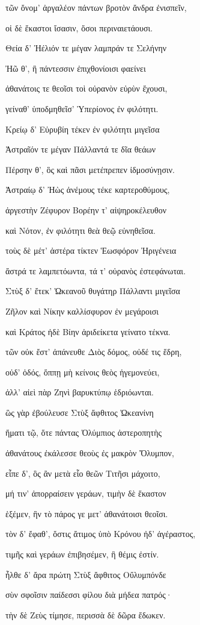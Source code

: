 \begin{pages}
\begin{Leftside}
τῶν ὄνομ' ἀργαλέον πάντων βροτὸν ἄνδρα ἐνισπεῖν, 

οἱ δὲ ἕκαστοι ἴσασιν, ὅσοι περιναιετάουσι.  

Θεία δ' Ἠέλιόν τε μέγαν λαμπράν τε Σελήνην 

Ἠῶ θ', ἣ πάντεσσιν ἐπιχθονίοισι φαείνει

ἀθανάτοις τε θεοῖσι τοὶ οὐρανὸν εὐρὺν ἔχουσι,

γείναθ' ὑποδμηθεῖσ' Ὑπερίονος ἐν φιλότητι. 

Κρείῳ δ' Εὐρυβίη τέκεν ἐν φιλότητι μιγεῖσα  

Ἀστραῖόν τε μέγαν Πάλλαντά τε δῖα θεάων

Πέρσην θ', ὃς καὶ πᾶσι μετέπρεπεν ἰδμοσύνῃσιν.

Ἀστραίῳ δ' Ἠὼς ἀνέμους τέκε καρτεροθύμους,

ἀργεστὴν Ζέφυρον Βορέην τ' αἰψηροκέλευθον 

καὶ Νότον, ἐν φιλότητι θεὰ θεῷ εὐνηθεῖσα. 

τοὺς δὲ μέτ' ἀστέρα τίκτεν Ἑωσφόρον Ἠριγένεια

ἄστρά τε λαμπετόωντα, τά τ' οὐρανὸς ἐστεφάνωται. 

Στὺξ δ' ἔτεκ' Ὠκεανοῦ θυγάτηρ Πάλλαντι μιγεῖσα

Ζῆλον καὶ Νίκην καλλίσφυρον ἐν μεγάροισι 

καὶ Κράτος ἠδὲ Βίην ἀριδείκετα γείνατο τέκνα.  

τῶν οὐκ ἔστ' ἀπάνευθε Διὸς δόμος, οὐδέ τις ἕδρη,

οὐδ' ὁδός, ὅππῃ μὴ κείνοις θεὸς ἡγεμονεύει,

ἀλλ' αἰεὶ πὰρ Ζηνὶ βαρυκτύπῳ ἑδριόωνται.

ὣς γὰρ ἐβούλευσε Στὺξ ἄφθιτος Ὠκεανίνη

ἤματι τῷ, ὅτε πάντας Ὀλύμπιος ἀστεροπητὴς 

ἀθανάτους ἐκάλεσσε θεοὺς ἐς μακρὸν Ὄλυμπον,

εἶπε δ', ὃς ἂν μετὰ εἷο θεῶν Τιτῆσι μάχοιτο,

μή τιν' ἀπορραίσειν γεράων, τιμὴν δὲ ἕκαστον

ἑξέμεν, ἣν τὸ πάρος γε μετ' ἀθανάτοισι θεοῖσι.

τὸν δ' ἔφαθ', ὅστις ἄτιμος ὑπὸ Κρόνου ἠδ' ἀγέραστος, 

τιμῆς καὶ γεράων ἐπιβησέμεν, ἣ θέμις ἐστίν.

ἦλθε δ' ἄρα πρώτη Στὺξ ἄφθιτος Οὔλυμπόνδε

σὺν σφοῖσιν παίδεσσι φίλου διὰ μήδεα πατρός· 

τὴν δὲ Ζεὺς τίμησε, περισσὰ δὲ δῶρα ἔδωκεν.


\end{Leftside}
\end{pages}
